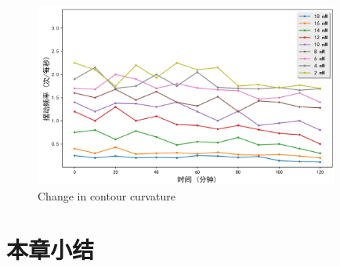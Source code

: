 	\begin{figure}[h]
	  \centering
	  \includegraphics[width=10cm]{figure/chap5/res.jpg}
		{Change in contour curvature}
	  \label{fig:res}
	\end{figure}
\section{本章小结}
